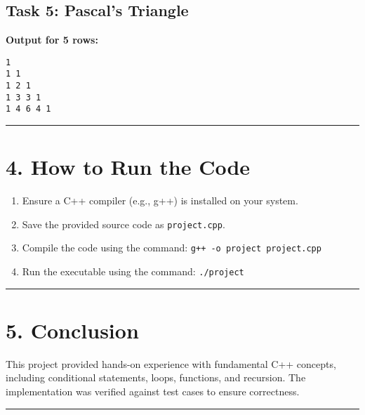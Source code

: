 \documentclass[12pt]{article}
\begin{document}
\subsection*{Task 5: Pascal's Triangle}
\textbf{Output for 5 rows:}
\begin{verbatim}
1
1 1
1 2 1
1 3 3 1
1 4 6 4 1
\end{verbatim}
\hrule
\section*{4. How to Run the Code}
\begin{enumerate}
    \item Ensure a C++ compiler (e.g., g++) is installed on your system.
    \item Save the provided source code as \texttt{project.cpp}.
    \item Compile the code using the command: \newline
    \texttt{g++ -o project project.cpp}
    \item Run the executable using the command: \newline
    \texttt{./project}
\end{enumerate}
\hrule
\section*{5. Conclusion}
This project provided hands-on experience with fundamental C++ concepts, including conditional statements, loops, functions, and recursion. The implementation was verified against test cases to ensure correctness.
\vspace{6pt}
\hrule
\end{document}
